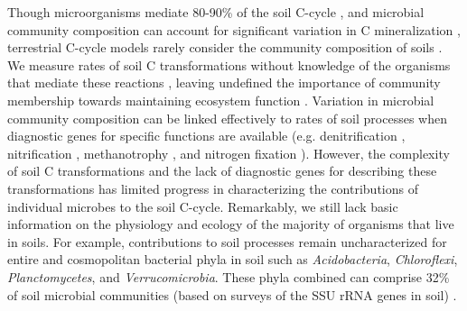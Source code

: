Though microorganisms mediate 80-90\% of the soil C-cycle
\citep{ColemanCrossley_1996,Nannipieri_2003}, and microbial community
composition can account for significant variation in C mineralization
\citep{Strickland_2009} , terrestrial C-cycle models rarely consider the
community composition of soils \citep{Zak2006,Reed2007}. We measure rates of
soil C transformations without knowledge of the organisms that
mediate these reactions \citep{Nannipieri_2003}, leaving undefined the
importance of community membership towards maintaining ecosystem function
\citep{Nannipieri_2003,Schimel_2012,Allison_2008}. Variation in microbial
community composition can be linked effectively to rates of soil processes when
diagnostic genes for specific functions are available (e.g. denitrification
\citep{Cavigelli2000}, nitrification \citep{Carney2004,Hawkes2005,Webster2005},
methanotrophy \citep{Gulledge1997}, and nitrogen fixation \citep{Hsu2009}).
However, the complexity of soil C transformations and the lack of diagnostic
genes for describing these transformations has limited progress in
characterizing the contributions of individual microbes to the soil C-cycle.
Remarkably, we still lack basic information on the physiology and ecology of
the majority of organisms that live in soils. For example, contributions to
soil processes remain uncharacterized for entire and cosmopolitan bacterial
phyla in soil  such as \textit{Acidobacteria}, \textit{Chloroflexi},
\textit{Planctomycetes}, and \textit{Verrucomicrobia}. These phyla combined can
comprise 32\% of soil microbial communities (based on surveys of the SSU rRNA
genes in soil) \citep{Janssen2006,Buckley2002}. 

